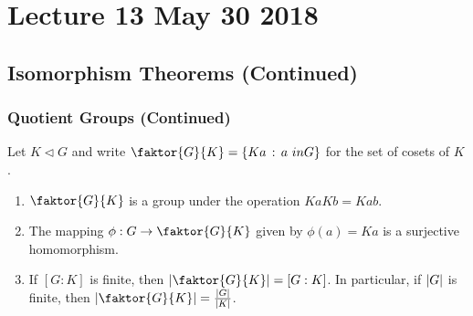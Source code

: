\chapter{Lecture 13 May 30 2018}%
\label{chp:lecture_13_may_30_2018}

\section{Isomorphism Theorems (Continued)}%
\label{sec:isomorphism_theorems_continued}

\subsection{Quotient Groups (Continued)}%
\label{sub:quotient_groups_continued}

\begin{propo}
\label{propo:propo_related_to_quotient_groups}
  Let $K \triangleleft G$ and write $\faktor{G}{K} = \{Ka \, : \, a \ in G\}$ for the set of cosets of $K$.
  \begin{enumerate}
    \item $\faktor{G}{K}$ is a group under the operation $Ka Kb = Kab$.
    \item The mapping $\phi : G \to \faktor{G}{K}$ given by $\phi(a) = Ka$ is a surjective homomorphism.
    \item If $[G : K]$ is finite, then $\abs{\faktor{G}{K}} = [G : K]$. In particular, if $\left|G\right|$ is finite, then $\abs{\faktor{G}{K}} = \frac{\abs{G}}{\abs{K}}$.
  \end{enumerate}
\end{propo}

